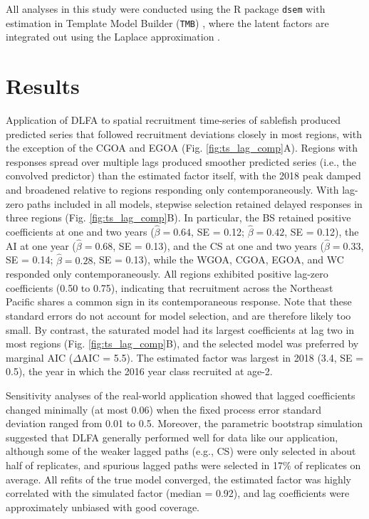\documentclass[12pt]{article}
\begin{document}
All analyses in this study were conducted using the R package
\texttt{dsem} \citep{thorson_dynamic_2024} with estimation in Template
Model Builder (\texttt{TMB}) \citep{kristensen_tmb:_2016}, where the
latent factors are integrated out using the Laplace approximation
\citep{skaug_automatic_2006}.

\section{Results}
\label{sec:results}

Application of DLFA to spatial recruitment time-series of sablefish
produced predicted series that followed recruitment deviations closely
in most regions, with the exception of the CGOA and EGOA (Fig.
\ref{fig:ts_lag_comp}A). Regions with responses spread over
multiple lags produced smoother predicted series (i.e., the convolved
predictor) than the estimated factor itself, with the 2018 peak damped
and broadened relative to regions responding only contemporaneously.
With lag-zero paths included in all models, stepwise selection retained
delayed responses in three regions (Fig. \ref{fig:ts_lag_comp}B). In
particular, the BS retained positive coefficients at one and two years
($\hat\beta = 0.64$, SE = 0.12; $\hat\beta = 0.42$, SE = 0.12), the AI
at one year ($\hat\beta = 0.68$, SE = 0.13), and the CS at one and two
years ($\hat\beta = 0.33$, SE = 0.14; $\hat\beta = 0.28$, SE = 0.13),
while the WGOA, CGOA, EGOA, and WC responded only contemporaneously.
All regions exhibited positive lag-zero coefficients (0.50 to 0.75),
indicating that recruitment across the Northeast Pacific shares a common
sign in its contemporaneous response. Note that these standard errors
do not account for model selection, and are therefore likely too
small. By contrast, the saturated model had its largest coefficients at
lag two in most regions (Fig. \ref{fig:ts_lag_comp}B), and the selected
model was preferred by marginal AIC ($\Delta$AIC = 5.5). The estimated
factor was largest in 2018 (3.4, SE = 0.5), the year in which the 2016
year class recruited at age-2.

Sensitivity analyses of the real-world application showed that lagged
coefficients changed minimally (at most 0.06) when the fixed process
error standard deviation ranged from 0.01 to 0.5. Moreover, the
parametric bootstrap simulation suggested that DLFA generally performed
well for data like our application, although some of the weaker lagged paths (e.g., CS) were
only selected in about half of replicates, and spurious lagged paths
were selected in 17\% of replicates on average. All refits of the true
model converged, the estimated factor was highly correlated with the
simulated factor (median = 0.92), and lag coefficients were
approximately unbiased with good coverage.
\end{document}
